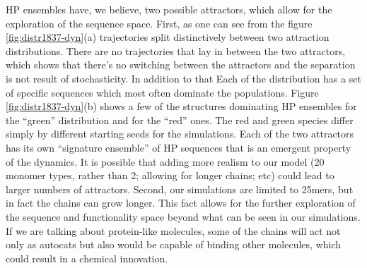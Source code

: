 \documentclass[5p,times]{elsarticle}
\begin{document}
HP ensembles have, we believe, two possible attractors, which allow for the exploration 
of the sequence space.  First, as one can see from the figure 
\ref{fig:distr1837-dyn}(a) trajectories split distinctively between two 
attraction distributions. There are no trajectories that lay in between the two attractors, which 
shows that there's no switching between the attractors and the separation is not result of 
stochasticity. In addition to that Each of the distribution has a set of specific sequences which 
most often dominate the populations. Figure \ref{fig:distr1837-dyn}(b) shows a few of the 
structures dominating HP ensembles for the ``green'' distribution and for the ``red'' ones.  The 
red and green species differ simply by different starting 
seeds for the simulations.  Each of the two attractors has its own ``signature ensemble'' of HP 
sequences that is an emergent property of the dynamics.  It is possible that adding more realism 
to 
our model (20 monomer types, rather than 2; allowing for longer chains; etc) could lead 
to larger numbers of attractors.
Second, our simulations are limited to 25mers, but in fact the chains can grow longer. This fact 
allows for the further exploration of the sequence and functionality space beyond what can be seen 
in our simulations. If we are talking about protein-like molecules, some of the chains will act 
not only as autocats but also would be capable of binding other molecules, which could result in a 
chemical innovation.
\end{document}
